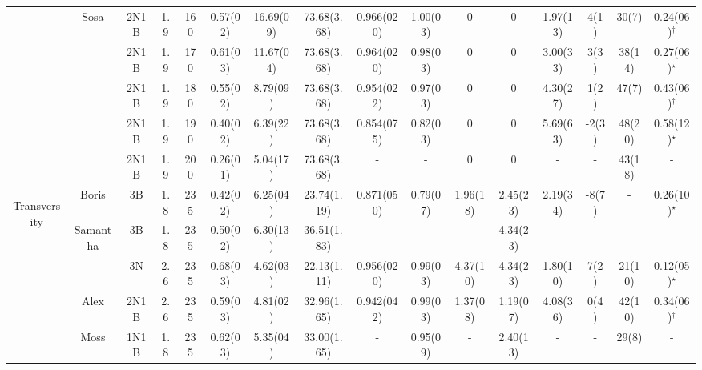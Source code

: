 \documentclass[pdftex,letterpaper,12pt]{report}
\begin{document}
\begin{table}
\begin{center}
\begin{tabular}{|c|c|ccc|ccc|ccccc|cc|c|}
			\cline{2-16}
			& \multirow{5}{*}{Sosa} & 2N1B & 1.9 & 160 & 0.57(02) & 16.69(09) & 73.68(3.68) & 0.966(020) & 1.00(03) & 0 & 0 & 1.97(13) & 4(1) & 30(7) & 0.24(06)$^\dagger$ \\
			&  & 2N1B & 1.9 & 170 & 0.61(03) & 11.67(04) & 73.68(3.68) & 0.964(020) & 0.98(03) & 0 & 0 & 3.00(33) & 3(3) & 38(14) & 0.27(06)$^\star$ \\
			&  & 2N1B & 1.9 & 180 & 0.55(02) & 8.79(09) & 73.68(3.68) & 0.954(022) & 0.97(03) & 0 & 0 & 4.30(27) & 1(2) & 47(7) & 0.43(06)$^\dagger$ \\
			&  & 2N1B & 1.9 & 190 & 0.40(02) & 6.39(22) & 73.68(3.68) & 0.854(075) & 0.82(03) & 0 & 0 & 5.69(63) & -2(3) & 48(20) & 0.58(12)$^\star$ \\
			&  & 2N1B & 1.9 & 200 & 0.26(01) & 5.04(17) & 73.68(3.68) & - & - & 0 & 0 & - & - & 43(18) & - \\
			\hline
			\hline
			\multirow{12}{*}{\begin{sideways}Transversity\end{sideways}} & Boris & 3B & 1.8 & 235 & 0.42(02) & 6.25(04) & 23.74(1.19) & 0.871(050) & 0.79(07) & 1.96(18) & 2.45(23) & 2.19(34) & -8(7) & - & 0.26(10)$^\star$ \\
			\cline{2-16}
			& \multirow{2}{*}{Samantha} & 3B & 1.8 & 235 & 0.50(02) & 6.30(13) & 36.51(1.83) & - & - & - & 4.34(23) & - & - & - & -\\
			& & 3N & 2.6 & 235 & 0.68(03) & 4.62(03) & 22.13(1.11) & 0.956(020) & 0.99(03) & 4.37(10) & 4.34(23) & 1.80(10) & 7(2) & 21(10) & 0.12(05)$^\star$\\
			\cline{2-16}
			& Alex & 2N1B & 2.6 & 235 & 0.59(03) & 4.81(02) & 32.96(1.65) & 0.942(042) & 0.99(03) & 1.37(08) & 1.19(07) & 4.08(36) & 0(4) & 42(10) & 0.34(06)$^\dagger$ \\
			\cline{2-16}
			& Moss & 1N1B & 1.8 & 235 & 0.62(03) & 5.35(04) & 33.00(1.65) & - & 0.95(09) & - & 2.40(13) & - & - & 29(8) & -\\

\end{tabular}
\end{center}
\end{table}
\end{document}
